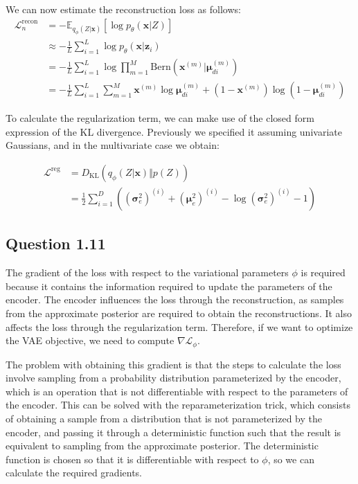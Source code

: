 \documentclass{article}
\begin{document}
We can now estimate the reconstruction loss as follows:
\begin{align*}
\mathcal{L}_n^{\text{recon}} &= -\mathbb{E}_{q_\phi(Z\vert\mathbf{x})}[\log p_\theta(\mathbf{x}\vert Z)] \\
&\approx -\frac{1}{L}\sum_{i=1}^L \log p_\theta(\mathbf{x}\vert \mathbf{z}_i) \\
&=
-\frac{1}{L}\sum_{i=1}^L\log \prod_{m=1}^M \text{Bern}(\mathbf{x}^{(m)}\vert \boldsymbol{\mu}_{di}^{(m)}) \\
&=
-\frac{1}{L}\sum_{i=1}^L\sum_{m=1}^M \mathbf{x}^{(m)}\log\boldsymbol{\mu}_{di}^{(m)} + (1-\mathbf{x}^{(m)})\log(1 -\boldsymbol{\mu}_{di}^{(m)})
\end{align*}

To calculate the regularization term, we can make use of the closed form expression of the KL divergence. Previously we specified it assuming univariate Gaussians, and in the multivariate case we obtain:

\begin{align*}
\mathcal{L}^{\text{reg}} &= \mathcal{} D_\text{KL}(q_\phi(Z\vert\mathbf{x})\Vert p(Z)) \\
&=
\frac{1}{2}\sum_{i=1}^D ((\boldsymbol{\sigma}_e^2)^{(i)} + (\boldsymbol{\mu}_e^2)^{(i)} - \log(\boldsymbol{\sigma}_e^2)^{(i)} - 1)
\end{align*}

\subsection*{Question 1.11}

The gradient of the loss with respect to the variational parameters $\phi$ is required because it contains the information required to update the parameters of the encoder. The encoder influences the loss through the reconstruction, as samples from the approximate posterior are required to obtain the reconstructions. It also affects the loss through the regularization term. Therefore, if we want to optimize the VAE objective, we need to compute $\nabla\mathcal{L}_\phi$.

The problem with obtaining this gradient is that the steps to calculate the loss involve sampling from a probability distribution parameterized by the encoder, which is an operation that is not differentiable with respect to the parameters of the encoder. This can be solved with the reparameterization trick, which consists of obtaining a sample from a distribution that is not parameterized by the encoder, and passing it through a deterministic function such that the result is equivalent to sampling from the approximate posterior. The deterministic function is chosen so that it is differentiable with respect to $\phi$, so we can calculate the required gradients.
\end{document}
